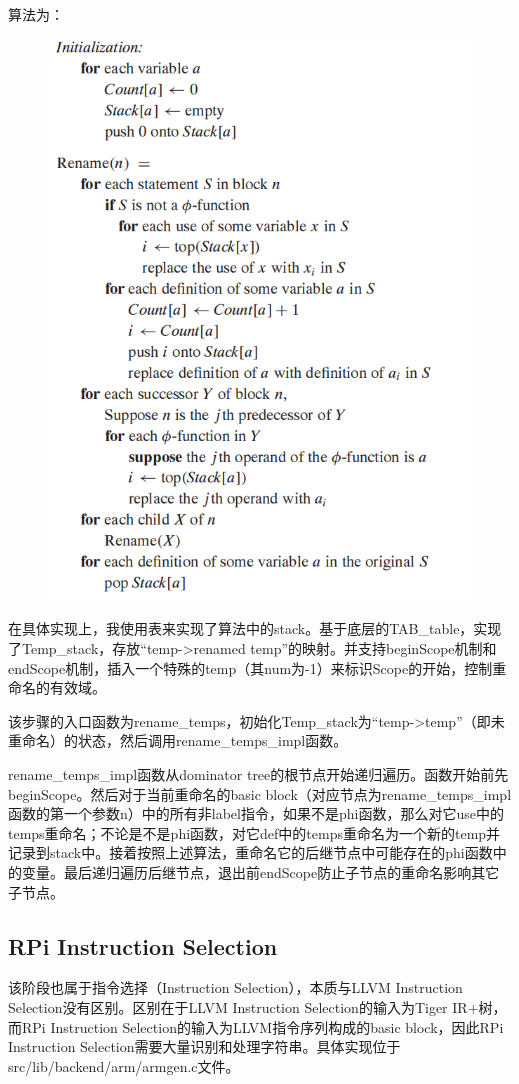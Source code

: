 \documentclass{article}
\begin{document}
算法为：
\begin{figure}[h]
  \centering
  \includegraphics[width=.6\linewidth]{pics/rename.jpg}
  \label{fig:rename_theory}
\end{figure}

在具体实现上，我使用表来实现了算法中的stack。基于底层的TAB\_table，实现了Temp\_stack，存放“temp->renamed temp”的映射。并支持beginScope机制和endScope机制，插入一个特殊的temp（其num为-1）来标识Scope的开始，控制重命名的有效域。

该步骤的入口函数为rename\_temps，初始化Temp\_stack为“temp->temp”（即未重命名）的状态，然后调用rename\_temps\_impl函数。

rename\_temps\_impl函数从dominator tree的根节点开始递归遍历。函数开始前先beginScope。然后对于当前重命名的basic block（对应节点为rename\_temps\_impl函数的第一个参数n）中的所有非label指令，如果不是phi函数，那么对它use中的temps重命名；不论是不是phi函数，对它def中的temps重命名为一个新的temp并记录到stack中。接着按照上述算法，重命名它的后继节点中可能存在的phi函数中的变量。最后递归遍历后继节点，退出前endScope防止子节点的重命名影响其它子节点。

\subsection{RPi Instruction Selection}
该阶段也属于指令选择（Instruction Selection），本质与LLVM Instruction Selection没有区别。区别在于LLVM Instruction Selection的输入为Tiger IR+树，而RPi Instruction Selection的输入为LLVM指令序列构成的basic block，因此RPi Instruction Selection需要大量识别和处理字符串。具体实现位于src/lib/backend/arm/armgen.c文件。
\end{document}
